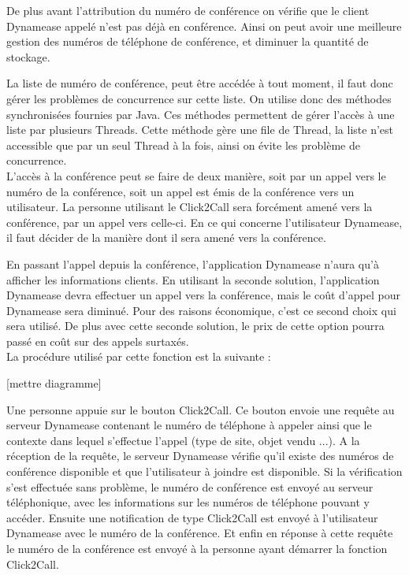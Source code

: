 De plus avant l'attribution du numéro de conférence on vérifie que le client Dynamease appelé n'est pas déjà en conférence. Ainsi on peut avoir une meilleure gestion des numéros de téléphone de conférence, et diminuer la quantité de stockage.

La liste de numéro de conférence, peut être accédée à tout moment, il faut donc gérer les problèmes de concurrence sur cette liste. On utilise donc des méthodes synchronisées fournies par Java. Ces méthodes permettent de gérer l'accès à une liste par plusieurs Threads. Cette méthode gère une file de Thread, la liste n'est accessible que par un seul Thread à la fois, ainsi on évite les problème de concurrence.\\

L'accès à la conférence peut se faire de deux manière, soit par un appel vers le numéro de la conférence, soit un appel est émis de la conférence vers un utilisateur. La personne utilisant le Click2Call sera forcément amené vers la conférence, par un appel vers celle-ci. En ce qui concerne l'utilisateur Dynamease, il faut décider de la manière dont il sera amené vers la conférence. 

En passant l'appel depuis la conférence, l'application Dynamease n'aura qu'à afficher les informations clients. En utilisant la seconde solution, l'application Dynamease devra effectuer un appel vers la conférence, mais le coût d'appel pour Dynamease sera diminué. Pour des raisons économique, c'est ce second choix qui sera utilisé. De plus avec cette seconde solution, le prix de cette option pourra passé en coût sur des appels surtaxés.\\

La procédure utilisé par cette fonction est la suivante :

[mettre diagramme]

Une personne appuie sur le bouton Click2Call. Ce bouton envoie une requête au serveur Dynamease contenant le numéro de téléphone à appeler ainsi que le contexte dans lequel s'effectue l'appel (type de site, objet vendu ...). A la réception de la requête, le serveur Dynamease vérifie qu'il existe des numéros de conférence disponible et que l'utilisateur à joindre est disponible. Si la vérification s'est effectuée sans problème, le numéro de conférence est envoyé au serveur téléphonique, avec les informations sur les numéros de téléphone pouvant y accéder. Ensuite une notification de type Click2Call est envoyé à l'utilisateur Dynamease avec le numéro de la conférence. Et enfin en réponse à cette requête le numéro de la conférence est envoyé à la personne ayant démarrer la fonction Click2Call.

